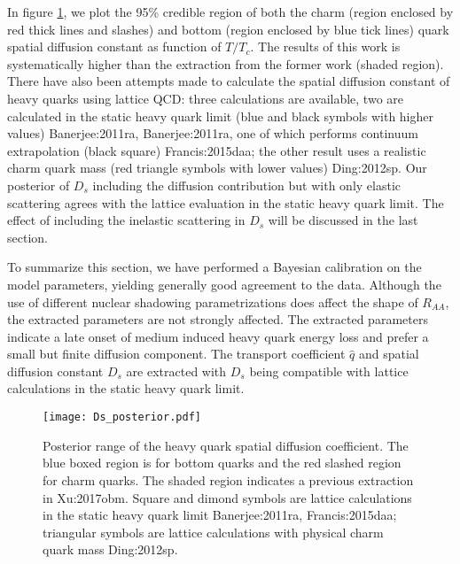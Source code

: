 In figure \ref{plots:posterior_Ds}, we plot the 95\% credible region of both the charm (region enclosed by red thick lines and slashes) and bottom (region enclosed by blue tick lines) quark spatial diffusion constant as function of $T/T_c$.
The results of this work is systematically higher than the extraction from the former work (shaded region).
There have also been attempts made to calculate the spatial diffusion constant of heavy quarks using lattice QCD: three calculations are available, two are calculated in the static heavy quark limit (blue and black symbols with higher values) {Banerjee:2011ra, Banerjee:2011ra}, one of which performs continuum extrapolation (black square) {Francis:2015daa}; the other result uses a realistic charm quark mass (red triangle symbols with lower values) {Ding:2012sp}.
Our posterior of $D_s$ including the diffusion contribution but with only elastic scattering agrees with the lattice evaluation in the static heavy quark limit.
The effect of including the inelastic scattering in $D_s$ will be discussed in the last section.

To summarize this section, we have performed a Bayesian calibration on the model parameters, yielding
generally good agreement to the data.
Although the use of different nuclear shadowing parametrizations does affect the shape of $R_{AA}$, the extracted parameters are not strongly affected.
The extracted parameters indicate a late onset of medium induced heavy quark energy loss and prefer a small but finite diffusion component.
The transport coefficient $\hat{q}$ and spatial diffusion constant $D_s$ are extracted with $D_s$ being compatible with lattice calculations in the static heavy quark limit. 

\begin{figure}
\texttt{[image: Ds\_posterior.pdf]}
\caption{Posterior range of the heavy quark spatial diffusion coefficient. The blue boxed region is for bottom quarks and the red slashed region for charm quarks. The shaded region indicates a previous extraction in {Xu:2017obm}. Square and dimond symbols are lattice calculations in the static heavy quark limit {Banerjee:2011ra, Francis:2015daa}; triangular symbols are lattice calculations with physical charm quark mass {Ding:2012sp}.}\label{plots:posterior_Ds}
\end{figure}


